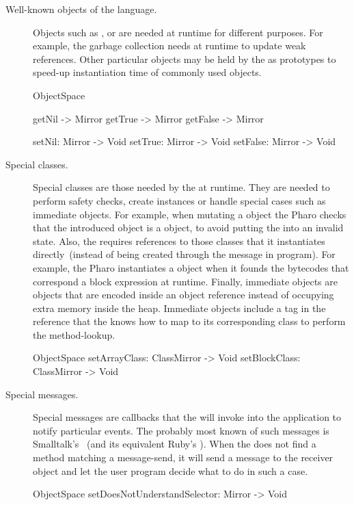 \begin{description}
\item[Well-known objects of the language.] Objects such as ,  or  are needed at runtime for different purposes. For example, the garbage collection needs  at runtime to update weak references. Other particular objects may be held by the \VM as prototypes to speed-up instantiation time of commonly used objects.

\begin{code}
ObjectSpace {
    getNil -> Mirror
    getTrue -> Mirror
    getFalse -> Mirror

    setNil: Mirror -> Void
    setTrue: Mirror -> Void
    setFalse: Mirror -> Void
}
\end{code}

\item[Special classes.] Special classes are those needed by the \VM at runtime. They are needed to perform safety checks, create instances or handle special cases such as immediate objects. For example, when mutating a  object the Pharo \VM checks that the introduced object is a  object, to avoid putting the  into an invalid state. Also, the \VM requires references to those classes that it instantiates directly~(instead of being created through the  message in program). For example, the Pharo \VM instantiates a  object when it founds the bytecodes that correspond a block expression at runtime. Finally, immediate objects are objects that are encoded inside an object reference instead of occupying extra memory inside the heap. Immediate objects include a tag in the reference that the \VM knows how to map to its corresponding class to perform the method-lookup. 

\begin{code}
ObjectSpace {
    setArrayClass: ClassMirror -> Void
    setBlockClass: ClassMirror -> Void
}
\end{code}

\item[Special messages.] Special messages are callbacks that the \VM will invoke into the application to notify particular events. The probably most known of such messages is Smalltalk's ~(and its equivalent Ruby's ). When the \VM does not find a method matching a message-send, it will send a  message to the receiver object and let the user program decide what to do in such a case.

\begin{code}
ObjectSpace {
    setDoesNotUnderstandSelector: Mirror -> Void
}
\end{code}

\end{description}

